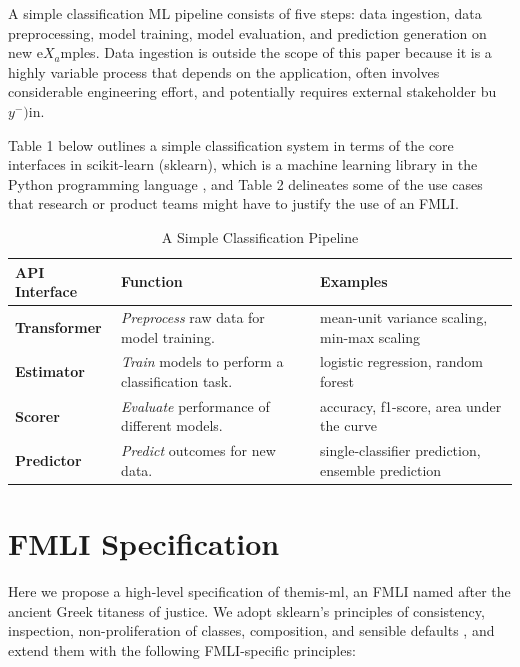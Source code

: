 \documentclass{acm_proc_article-sp}
\begin{document}
A simple classification ML pipeline consists of five steps: data ingestion, data
preprocessing, model training, model evaluation, and prediction generation on
new e\(X_a\)mples. Data ingestion is outside the scope of this paper because it is a
highly variable process that depends on the application, often involves
considerable engineering effort, and potentially requires external stakeholder
bu\(y^{-})\)in.

Table 1 below outlines a simple classification system in terms of the core
interfaces in scikit-learn (sklearn), which is a machine learning library in the
Python programming language \cite{buitinck2013api}, and Table 2 delineates some
of the use cases that research or product teams might have to justify the use of
an FMLI.


\begin{table}
  \caption{A Simple Classification Pipeline}
  \renewcommand{\arraystretch}{1.75}
  \small\noindent\begin{tabularx}{\linewidth}{l X X}
    \textbf{API Interface} & \textbf{Function} & \textbf{Examples} \\
    \hline
    \textbf{Transformer} &
      \emph{Preprocess} raw data for model training. &
      mean-unit variance scaling, min-max scaling \\
    \textbf{Estimator} &
      \emph{Train} models to perform a classification task. &
      logistic regression, random forest \\
    \textbf{Scorer} &
      \emph{Evaluate} performance of different models. &
      accuracy, f1-score, area under the curve \\
    \textbf{Predictor} &
      \emph{Predict} outcomes for new data. &
      single-classifier prediction, ensemble prediction
  \end{tabularx}
\end{table}


\section{FMLI Specification} Here we propose a high-level specification of
themis-ml, an FMLI named after the ancient Greek titaness of justice. We adopt
sklearn's principles of consistency, inspection, non-proliferation of classes,
composition, and sensible defaults \cite{buitinck2013api}, and extend them with
the following FMLI-specific principles:
\end{document}
